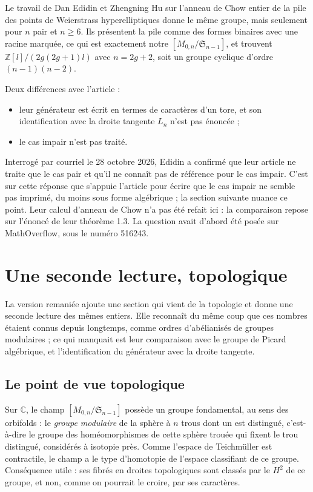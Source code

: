 \documentclass[11pt,a4paper]{amsart}
\theoremstyle{definition}
\theoremstyle{plain}
\theoremstyle{remark}
\newcommand{\M}{M_{0,n}}
\newcommand{\Sn}{\mathfrak S}
\begin{document}
Le travail de Dan Edidin et Zhengning Hu sur l'anneau de Chow entier de la pile des points de Weierstrass hyperelliptiques donne le même groupe, mais seulement pour $n$ pair et $n \ge 6$. Ils présentent la pile comme des formes binaires avec une racine marquée, ce qui est exactement notre $[\M/\Sn_{n-1}]$, et trouvent $\mathbb Z[l]/(2g(2g+1)l)$ avec $n = 2g+2$, soit un groupe cyclique d'ordre $(n-1)(n-2)$.

Deux différences avec l'article :

\begin{itemize}
\item leur générateur est écrit en termes de caractères d'un tore, et son identification avec la droite tangente $L_n$ n'est pas énoncée ;
\item le cas impair n'est pas traité.
\end{itemize}

Interrogé par courriel le 28 octobre 2026, Edidin a confirmé que leur article ne traite que le cas pair et qu'il ne connaît pas de référence pour le cas impair. C'est sur cette réponse que s'appuie l'article pour écrire que le cas impair ne semble pas imprimé, du moins sous forme algébrique ; la section suivante nuance ce point. Leur calcul d'anneau de Chow n'a pas été refait ici : la comparaison repose sur l'énoncé de leur théorème 1.3. La question avait d'abord été posée sur MathOverflow, sous le numéro 516243.

\section{Une seconde lecture, topologique}

La version remaniée ajoute une section qui vient de la topologie et donne une seconde lecture des mêmes entiers. Elle reconnaît du même coup que ces nombres étaient connus depuis longtemps, comme ordres d'abélianisés de groupes modulaires ; ce qui manquait est leur comparaison avec le groupe de Picard algébrique, et l'identification du générateur avec la droite tangente.

\subsection{Le point de vue topologique}

Sur $\mathbb C$, le champ $[\M/\Sn_{n-1}]$ possède un groupe fondamental, au sens des orbifolds : le \emph{groupe modulaire} de la sphère à $n$ trous dont un est distingué, c'est-à-dire le groupe des homéomorphismes de cette sphère trouée qui fixent le trou distingué, considérés à isotopie près. Comme l'espace de Teichmüller est contractile, le champ a le type d'homotopie de l'espace classifiant de ce groupe. Conséquence utile : ses fibrés en droites topologiques sont classés par le $H^2$ de ce groupe, et non, comme on pourrait le croire, par ses caractères.
\end{document}
